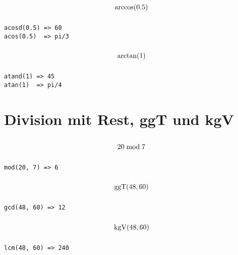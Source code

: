 \documentclass
[
  fontsize = 11pt,
  parskip  = half-,
  BCOR     = 0pt,
  DIV      = 11,
  ngerman
]
{scrartcl}
\begin{document}
\begin{minipage}{\mw}
  \begin{equation*}
    \vphantom{\bigg(}%
    \arccos(\num{0.5})
  \end{equation*}
\end{minipage}%
\hfill
\begin{minipage}{\cw}
\begin{verbatim}
acosd(0.5) => 60
acos(0.5)  => pi/3
\end{verbatim}
\end{minipage}

\begin{minipage}{\mw}
  \begin{equation*}
    \vphantom{\bigg(}%
    \arctan(1)
  \end{equation*}
\end{minipage}%
\hfill
\begin{minipage}{\cw}
\begin{verbatim}
atand(1) => 45
atan(1)  => pi/4
\end{verbatim}
\end{minipage}

\section{Division mit Rest, ggT und kgV}
\begin{minipage}{\mw}
  \begin{equation*}
    \vphantom{\bigg(}%
    20\bmod7
  \end{equation*}
\end{minipage}%
\hfill
\begin{minipage}{\cw}
\begin{verbatim}
mod(20, 7) => 6
\end{verbatim}
\end{minipage}
\begin{minipage}{\mw}
  \begin{equation*}
    \vphantom{\bigg(}%
    \operatorname{ggT}(48, 60)
  \end{equation*}
\end{minipage}%
\hfill
\begin{minipage}{\cw}
\begin{verbatim}
gcd(48, 60) => 12
\end{verbatim}
\end{minipage}
\begin{minipage}{\mw}
  \begin{equation*}
    \vphantom{\bigg(}%
    \operatorname{kgV}(48, 60)
  \end{equation*}
\end{minipage}%
\hfill
\begin{minipage}{\cw}
\begin{verbatim}
lcm(48, 60) => 240
\end{verbatim}
\end{minipage}
\end{document}
